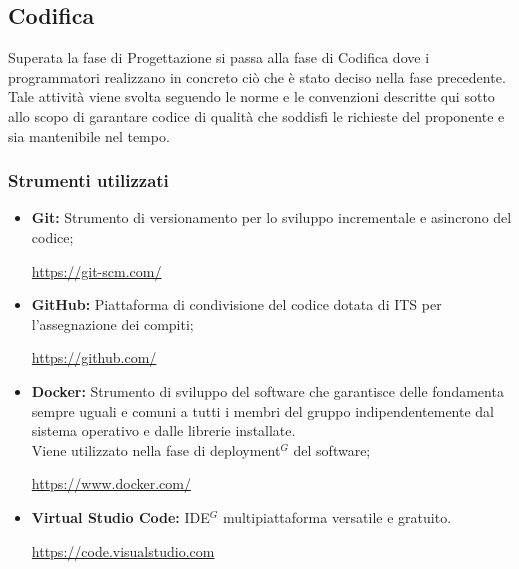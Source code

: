 \subsection{Codifica}
Superata la fase di Progettazione si passa alla fase di Codifica dove i programmatori
realizzano in concreto ciò che è stato deciso nella fase precedente.
Tale attività viene svolta seguendo le norme e le convenzioni descritte qui sotto allo
scopo di garantare codice di qualità che soddisfi le richieste del proponente e sia mantenibile nel tempo.

\subsubsection{Strumenti utilizzati}
    \begin{itemize}
    \item \textbf{Git:} Strumento di versionamento per lo sviluppo incrementale e asincrono del codice;
    \begin{center}
      \url{https://git-scm.com/}
    \end{center}
    \item \textbf{GitHub:} Piattaforma di condivisione del codice dotata di ITS per l'assegnazione dei compiti;
    \begin{center}
      \url{https://github.com/}
    \end{center}
    \item \textbf{Docker:} Strumento di sviluppo del software che garantisce delle fondamenta sempre uguali
      e comuni a tutti i membri del gruppo indipendentemente dal sistema operativo e dalle librerie installate. \\
      Viene utilizzato nella fase di deployment$^{G}$ del software;
      \begin{center}
        \url{https://www.docker.com/}
      \end{center}
    \item \textbf{Virtual Studio Code:} IDE$^{G}$ multipiattaforma versatile e gratuito.
    \begin{center}
      \url{https://code.visualstudio.com}
    \end{center}
    \end{itemize}
